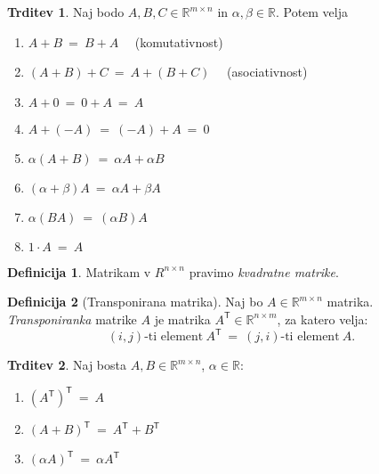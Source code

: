 \documentclass[11pt]{article}
\newcommand{\R}{\mathbb{R}}
\newcommand{\0}{\mathbf{0}}
\newcommand{\T}{\mathsf{T}}
\theoremstyle{definition}
\newtheorem{definicija}{Definicija}[section]
\theoremstyle{definition}
\newtheorem{trditev}{Trditev}[section]
\theoremstyle{definition}
\theoremstyle{definition}
\begin{document}
\begin{trditev}

Naj bodo $A,B,C \in \R^{m \times n}$ in $\alpha,\beta \in \R$. Potem velja
\begin{enumerate}
	\item $A+B ~=~ B+A$ ~~(komutativnost)
	\item $(A+B)+C ~=~ A+(B+C)$ ~~(asociativnost)
	\item $A+0 ~=~ 0+A ~=~ A$
	\item $A+(-A) ~=~ (-A)+A ~=~ 0$
	\item $\alpha(A+B) ~=~ \alpha A + \alpha B$
	\item $(\alpha + \beta)A ~=~ \alpha A + \beta A$
	\item $\alpha(BA) ~=~ (\alpha B)A$
	\item $1 \cdot A ~=~ A$
\end{enumerate}

\end{trditev}
\vspace{0.5cm}

\begin{definicija}

Matrikam v $R^{n \times n}$ pravimo \textit{kvadratne matrike}.

\end{definicija}
\vspace{0.5cm}

\begin{definicija}[Transponirana matrika]

Naj bo $A \in \R^{m \times n}$ matrika. \textit{Transponiranka} matrike $A$ je matrika $A^\T \in \R^{n \times m}$, za katero velja:
$$(i,j)\text{-ti element}~A^\T ~=~ (j,i)\text{-ti element}~A.$$

\end{definicija}
\vspace{0.5cm}

\begin{trditev}

Naj bosta $A,B \in \R^{m \times n}$, $\alpha \in \R$:
\begin{enumerate}
	\item $(A^\T)^\T ~=~ A$
	\item $(A+B)^\T ~=~ A^\T + B^\T$
	\item $(\alpha A)^\T ~=~ \alpha A^\T$
\end{enumerate}

\end{trditev}
\vspace{0.5cm}
\end{document}
